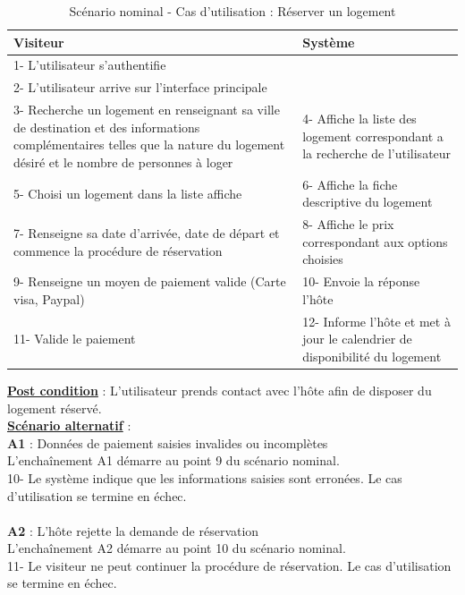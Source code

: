\begin{table}[H]
\begin{center}
\begin{tabular}{|p{8cm}|p{8cm}|}
\hline
Visiteur & Système\\
\hline
1- L’utilisateur s’authentifie	& $ $\\
\hline
2- L’utilisateur arrive sur l’interface principale & $ $\\
\hline	
3- Recherche un logement en renseignant sa ville de destination et des informations complémentaires telles que la nature du logement désiré et le nombre de personnes à loger & 4- Affiche la liste des logement correspondant a la recherche de l'utilisateur\\
\hline
5- Choisi un logement dans la liste affiche & 6- Affiche la fiche descriptive du logement\\
\hline
7- Renseigne sa date d'arrivée, date de départ et commence la procédure de réservation & 8- Affiche le prix correspondant aux options choisies\\
\hline
9- Renseigne un moyen de paiement valide (Carte visa, Paypal) & 10- Envoie la réponse l'hôte\\
\hline
11- Valide le paiement & 12- Informe l'hôte et met à jour le calendrier de disponibilité du logement\\
\hline
\end{tabular}
\caption{Scénario nominal - Cas d'utilisation : Réserver un logement}
\end{center}
\end{table}

\begin{flushleft}
\underline{\textbf{Post condition}} : L’utilisateur prends contact avec l'hôte afin de disposer du logement réservé.
\\\underline{\textbf{Scénario alternatif}} :
\\\textbf{A1} : Données de paiement saisies invalides ou incomplètes
\\L'enchaînement A1 démarre au point 9 du scénario nominal.
\\10- Le système indique que les informations saisies sont erronées. Le cas d’utilisation se termine en échec.
\\$ $\\\textbf{A2} : L'hôte rejette la demande de réservation
\\L'enchaînement A2 démarre au point 10 du scénario nominal.
\\11- Le visiteur ne peut continuer la procédure de réservation. Le cas d’utilisation se termine en échec.
\end{flushleft}

